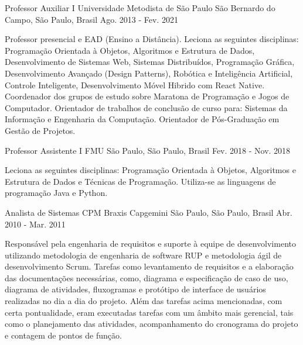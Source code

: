 \begin{cventries}
  \cventry
    {Professor Auxiliar I} %
    {Universidade Metodista de São Paulo} %
    {São Bernardo do Campo, São Paulo, Brasil} %
    {Ago. 2013 - Fev. 2021} %
    {
      \begin{cvitems} %
        \item {Professor presencial e EAD (Ensino a Distância). Leciona as seguintes disciplinas: Programação Orientada à Objetos, Algoritmos e Estrutura de Dados, Desenvolvimento de Sistemas Web, Sistemas Distribuídos, Programação Gráfica, Desenvolvimento Avançado (Design Patterns), Robótica e Inteligência Artificial, Controle Inteligente, Desenvolvimento Móvel Hibrido com React Native. Coordenador dos grupos de estudo sobre Maratona de Programação e Jogos de Computador. Orientador de trabalhos de conclusão de curso para: Sistemas da Informação e Engenharia da Computação. Orientador de Pós-Graduação em Gestão de Projetos.}
      \end{cvitems}
    }

  \cventry
    {Professor Assistente I} %
    {FMU} %
    {São Paulo, São Paulo, Brasil} %
    {Fev. 2018 - Nov. 2018} %
    {
      \begin{cvitems} %
        \item {Leciona as seguintes disciplinas: Programação Orientada à Objetos, Algoritmos e Estrutura de Dados e Técnicas de Programação. Utiliza-se as linguagens de programação Java e Python.}
      \end{cvitems}
    }

  \cventry
    {Analista de Sistemas} %
    {CPM Braxis Capgemini} %
    {São Paulo, São Paulo, Brasil} %
    {Abr. 2010 - Mar. 2011} %
    {
      \begin{cvitems} %
        \item {Responsável pela engenharia de requisitos e suporte à equipe de desenvolvimento utilizando metodologia de engenharia de software RUP e metodologia ágil de desenvolvimento Scrum. Tarefas como levantamento de requisitos e a elaboração das documentações necessárias, como, diagrama e especificação de caso de uso, diagrama de atividades, fluxogramas e protótipo de interface de usuários realizadas no dia a dia do projeto. Além das tarefas acima mencionadas, com certa pontualidade, eram executadas tarefas com um âmbito mais gerencial, tais como o planejamento das atividades, acompanhamento do cronograma do projeto e contagem de pontos de função.}
      \end{cvitems}
    }


\end{cventries}
